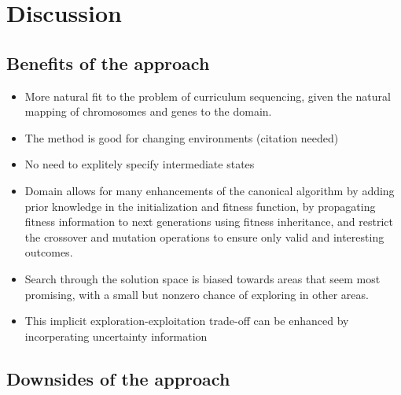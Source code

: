 \section{Discussion}
\label{approach_discussion}
\subsection{Benefits of the approach}
\begin{itemize}
	\item More natural fit to the problem of curriculum sequencing, given the
		natural mapping of chromosomes and genes to the domain.
	\item The method is good for changing environments (citation needed)
	\item No need to explitely specify intermediate states
	\item Domain allows for many enhancements of the canonical algorithm by
		adding prior knowledge in the initialization and fitness function, by
		propagating fitness information to next generations using fitness
		inheritance, and restrict the crossover and mutation operations to
		ensure only valid and interesting outcomes.
	\item Search through the solution space is biased towards areas that seem
		most promising, with a small but nonzero chance of exploring in other
		areas.
	\item This implicit exploration-exploitation trade-off can be enhanced by
		incorperating uncertainty information
\end{itemize}
\subsection{Downsides of the approach}
